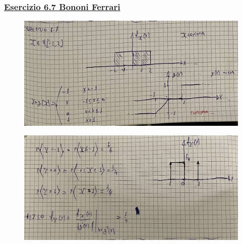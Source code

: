 \documentclass{article}
\begin{document}
\subsubsection{\underline{Esercizio 6.7 Bononi Ferrari}}
\begin{figure}[ht]
\centering
\includegraphics[scale=0.10]{ese/32.jpeg}
\end{figure}
\begin{figure}[ht]
\centering
\includegraphics[scale=0.10]{ese/32a.jpeg}
\end{figure}
\end{document}
